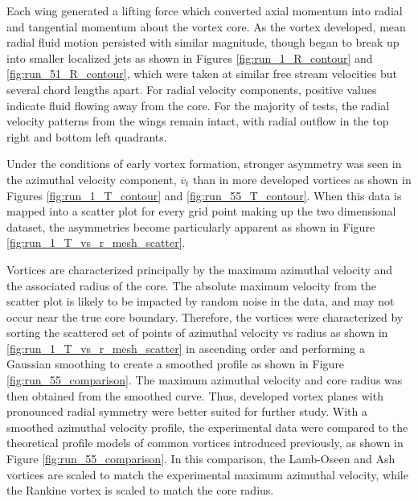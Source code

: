 Each wing generated a lifting force which converted axial momentum into radial 
and tangential momentum about the vortex core. As the vortex developed, mean 
radial fluid motion persisted with similar magnitude, though began to break up 
into smaller localized jets as shown in Figures \ref{fig:run_1_R_contour} and 
\ref{fig:run_51_R_contour}, which were taken at similar free stream velocities 
but several chord lengths apart. For radial velocity components, positive 
values indicate fluid flowing away from the core. For the majority of tests, 
the radial velocity patterns from the wings remain intact, with radial outflow 
in the top right and bottom left quadrants. 




Under the conditions of early vortex formation, stronger asymmetry was seen in 
the azimuthal velocity component, $\overline v_{t}$ than in more developed 
vortices as 
shown in Figures \ref{fig:run_1_T_contour} and \ref{fig:run_55_T_contour}. When 
this data is mapped into a scatter plot for every grid point making up the 
two dimensional dataset, the asymmetries become particularly apparent as shown 
in Figure \ref{fig:run_1_T_vs_r_mesh_scatter}.





Vortices are characterized principally by the maximum azimuthal velocity 
and the associated radius of the core. The absolute maximum velocity from the 
scatter plot is likely to be impacted by random noise in the data, and may 
not occur near the true core boundary. Therefore, the vortices were 
characterized by sorting the scattered set of points of azimuthal velocity vs 
radius as shown in \ref{fig:run_1_T_vs_r_mesh_scatter} in ascending order and 
performing a Gaussian smoothing to create a smoothed profile as shown in Figure 
\ref{fig:run_55_comparison}. The maximum azimuthal velocity and core radius was 
then obtained from the smoothed curve. Thus,
developed vortex planes with pronounced radial symmetry were better suited for 
further study. With a smoothed azimuthal velocity profile, the experimental 
data were compared to the theoretical profile models of common vortices 
introduced previously, as shown in Figure \ref{fig:run_55_comparison}. In this 
comparison, the Lamb-Oseen and Ash vortices are scaled to match the 
experimental maximum azimuthal velocity, while the Rankine vortex is scaled to 
match the core radius.

